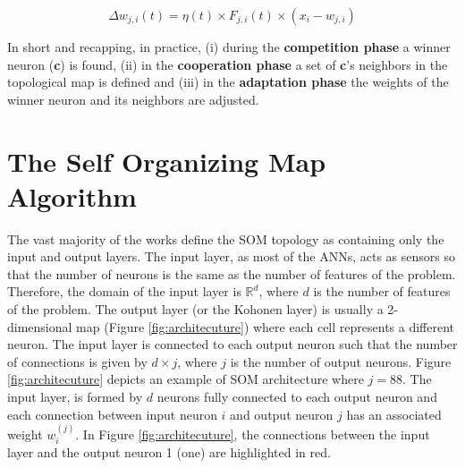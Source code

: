 \begin{equation}
    \Delta w_{j,i}(t) = \eta(t) \times F_{j,i}(t) \times (x_{i} - w_{j,i})
    \label{eq:delta_weight}
\end{equation}

\vspace{0.2cm}


In short and recapping, in practice, (i) during the \textbf{competition phase} a winner neuron (\textbf{c}) is found, (ii) in the \textbf{cooperation phase} a set of \textbf{c}'s neighbors in the topological map is defined and (iii) in the \textbf{adaptation phase} the weights of the winner neuron and its neighbors are adjusted.

\section{The Self Organizing Map Algorithm}
\label{sec:som}

The vast majority of the works define the SOM topology as containing only the input and output layers. The input layer, as most of the ANNs, acts as sensors so that the number of neurons is the same as the number of features of the problem. Therefore, the domain of the input layer is $\mathbb{R}^{d}$, where $d$ is the number of features of the problem. The output layer (or the Kohonen layer) is usually a 2-dimensional map (Figure \ref{fig:architecuture}) where each cell represents a different neuron. The input layer is connected to each output neuron such that the number of connections is given by $d \times j$, where $j$ is the number of output neurons. Figure \ref{fig:architecuture} depicts an example of SOM architecture where $j = 88$. The input layer, is formed by $d$ neurons fully connected to each output neuron and each connection between input neuron $i$ and output neuron $j$ has an associated weight $w_{i}^{(j)}$. In Figure \ref{fig:architecuture}, the connections between the input layer and the output neuron 1 (one) are highlighted in red.

